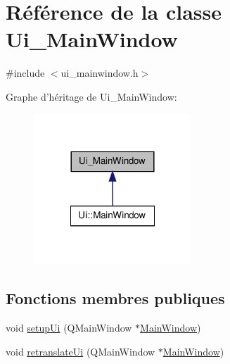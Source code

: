 \hypertarget{class_ui___main_window}{\section{\-Référence de la classe \-Ui\-\_\-\-Main\-Window}
\label{class_ui___main_window}
}


{\ttfamily \#include $<$ui\-\_\-mainwindow.\-h$>$}



\-Graphe d'héritage de \-Ui\-\_\-\-Main\-Window\-:\nopagebreak
\begin{figure}[H]
\begin{center}
\leavevmode
\includegraphics[width=168pt]{class_ui___main_window__inherit__graph}
\end{center}
\end{figure}
\subsection*{\-Fonctions membres publiques}
\begin{DoxyCompactItemize}
\item 
void \hyperlink{class_ui___main_window_acf4a0872c4c77d8f43a2ec66ed849b58}{setup\-Ui} (\-Q\-Main\-Window $\ast$\hyperlink{class_main_window}{\-Main\-Window})
\item 
void \hyperlink{class_ui___main_window_a097dd160c3534a204904cb374412c618}{retranslate\-Ui} (\-Q\-Main\-Window $\ast$\hyperlink{class_main_window}{\-Main\-Window})
\end{DoxyCompactItemize}
